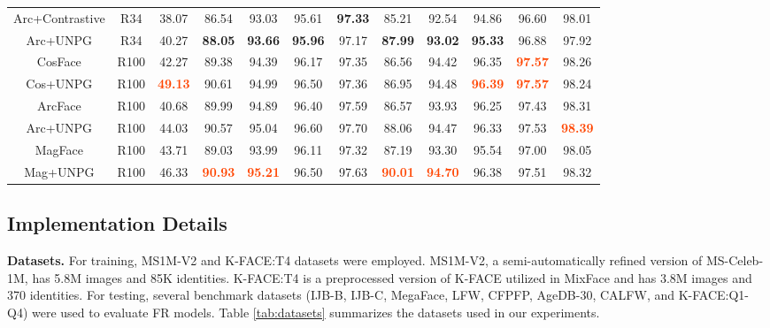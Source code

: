\documentclass[10pt,twocolumn]{article}
\begin{document}
\begin{table*}[htb]
{\begin{tabular}[]{ c c c c c c c c c c c c }
         Arc+Contrastive & R34 & 38.07 & 86.54 & 93.03 & 95.61 & \textbf{\textcolor{NavyBlue}{97.33}} & 85.21 & 92.54 & 94.86 & 96.60 & 98.01 \\
         \rowcolor{lightgray!20}
         Arc+UNPG & R34 & 40.27	& \textbf{\textcolor{NavyBlue}{88.05}} & \textbf{\textcolor{NavyBlue}{93.66}} & \textbf{\textcolor{NavyBlue}{95.96}} & 97.17 & \textbf{\textcolor{NavyBlue}{87.99}} & \textbf{\textcolor{NavyBlue}{93.02}} & \textbf{\textcolor{NavyBlue}{95.33}} & 96.88 & 97.92 \\
         \hline
         CosFace & R100 & 42.27	& 89.38	& 94.39	& 96.17	& 97.35	& 86.56	& 94.42	& 96.35	& \textbf{\textcolor{OrangeRed}{97.57}}	& 98.26 \\
         \rowcolor{lightgray!20}
         Cos+UNPG & R100 & \textbf{\textcolor{OrangeRed}{49.13}} & 90.61 & 94.99 & 96.50 & 97.36 & 86.95 & 94.48 & \textbf{\textcolor{OrangeRed}{96.39}} & \textbf{\textcolor{OrangeRed}{97.57}} & 98.24 \\
         ArcFace & R100 & 40.68	& 89.99	& 94.89	& 96.40	& 97.59	& 86.57	& 93.93	& 96.25	& 97.43	& 98.31 \\
         \rowcolor{lightgray!20}
         Arc+UNPG & R100 & 44.03 & 90.57 & 95.04 & 96.60 & 97.70 & 88.06 & 94.47 & 96.33 & 97.53 & \textbf{\textcolor{OrangeRed}{98.39}} \\
         MagFace & R100 & 43.71	& 89.03	& 93.99	& 96.11	& 97.32	& 87.19	& 93.30	& 95.54	& 97.00	& 98.05 \\
         \rowcolor{lightgray!20}
         Mag+UNPG & R100 & 46.33 & \textbf{\textcolor{OrangeRed}{90.93}} & \textbf{\textcolor{OrangeRed}{95.21}} & 96.50 & 97.63 & \textbf{\textcolor{OrangeRed}{90.01}} & \textbf{\textcolor{OrangeRed}{94.70}} & 96.38 & 97.51 & 98.32 \\
         \hline
        \end{tabular}
        }
\end{table*}
\subsection{Implementation Details}
\noindent\textbf{Datasets.} For training, MS1M-V2\cite{deng2019arcface} and K-FACE:T4\cite{jung2021mixface} datasets were employed. MS1M-V2, a semi-automatically refined version of MS-Celeb-1M\cite{guo2016ms}, has 5.8M images and 85K identities. K-FACE:T4 is a preprocessed version of K-FACE\cite{choi2021k} utilized in MixFace\cite{jung2021mixface} and has 3.8M images and 370 identities. For testing, several benchmark datasets (IJB-B\cite{whitelam2017iarpa}, IJB-C\cite{maze2018iarpa}, MegaFace\cite{kemelmacher2016megaface}, LFW\cite{huang2008labeled}, CFPFP\cite{sengupta2016frontal}, AgeDB-30\cite{moschoglou2017agedb}, CALFW\cite{zheng2017cross}, and K-FACE:Q1-Q4\cite{jung2021mixface}) were used to evaluate FR models. Table \ref{tab:datasets} summarizes the datasets used in our experiments. 
\end{document}
